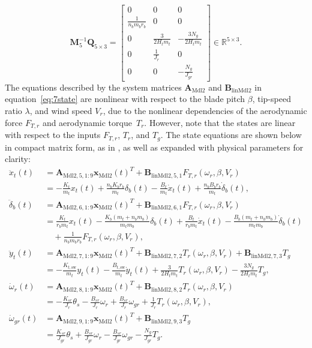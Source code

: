 \[
\mathbf{M}_5^{-1}\mathbf{Q}_{5 \times 3} = \begin{bmatrix}
     0 & 0 & 0\\
    \frac{1}{n_b m_b r_b} & 0 & 0 \\
     0 & \frac{3}{2 H_t m_t} & -\frac{3 N_g}{2 H_t m_t}\\
     0 & \frac{1}{J_r} & 0\\
     0 & 0 & -\frac{N_{g}}{J_{gr}}
\end{bmatrix} \in \mathbb{R}^{5 \times 3}.
\]
%
The equations described by the system matrices \(\bm{A}_{\text{Mdl2}}\) and \(\bm{B}_{\text{linMdl2}}\) in equation~\eqref{eq:7state} are nonlinear with respect to the blade pitch \(\beta\), tip-speed ratio \(\lambda\), and wind speed \(V_r\), due to the nonlinear dependencies of the aerodynamic force \(F_{T,r}\) and aerodynamic torque~\(T_r\). However, note that the states are linear with respect to the inputs $F_{T,r}$, $T_r$, and $T_g$. The state equations are shown below in compact matrix form, as in \cite{dittmer2021velocity}, as well as expanded with physical parameters for clarity:
\begin{align*}
    \ddot{x}_t(t) &= \bm{A}_{\text{Mdl2}, 5, 1:9} \bm{x}_{\text{Mdl2}}(t)^T + \bm{B}_{\text{linMdl2}, 5, 1} F_{T,r}(\omega_r, \beta, V_r) \\
    &= -\frac{K_t}{m_t} x_t(t) + \frac{n_b K_b r_b}{m_t} \delta_b(t)
    - \frac{B_t}{m_t} \dot{x}_t(t) + \frac{n_b B_b r_b}{m_t} \dot{\delta}_b(t), \\[1ex]
    \ddot{\delta}_b(t) &= \bm{A}_{\text{Mdl2}, 6, 1:9} \bm{x}_{\text{Mdl2}}(t)^T + \bm{B}_{\text{linMdl2}, 6, 1} F_{T,r}(\omega_r, \beta, V_r) \\
    &= \frac{K_t}{r_b m_t} x_t(t) - \frac{K_b(m_t + n_b m_b)}{m_t m_b} \delta_b(t)
    + \frac{B_t}{r_b m_t} \dot{x}_t(t) - \frac{B_b(m_t + n_b m_b)}{m_t m_b} \dot{\delta}_b(t) \\
    &\quad + \frac{1}{n_b m_b r_b} F_{T,r}(\omega_r, \beta, V_r), \\[1ex]
    \ddot{y}_t(t) &= \bm{A}_{\text{Mdl2}, 7, 1:9} \bm{x}_{\text{Mdl2}}(t)^T
    + \bm{B}_{\text{linMdl2}, 7, 2} T_r(\omega_r, \beta, V_r)
    + \bm{B}_{\text{linMdl2}, 7, 3} T_g \\
    &= -\frac{K_{t,\text{sw}}}{m_t} y_t(t) - \frac{B_{t,\text{sw}}}{m_t} \dot{y}_t(t)
    + \frac{3}{2 H_t m_t} T_r(\omega_r, \beta, V_r)
    - \frac{3 N_g}{2 H_t m_t} T_g, \\[1ex]
    \dot{\omega}_r(t) &= \bm{A}_{\text{Mdl2}, 8, 1:9} \bm{x}_{\text{Mdl2}}(t)^T + \bm{B}_{\text{linMdl2}, 8, 2} T_r(\omega_r, \beta, V_r) \\
    &= -\frac{K_{sr}}{J_r} \theta_s - \frac{B_{sr}}{J_r} \omega_r + \frac{B_{sr}}{J_r} \omega_{gr}
    + \frac{1}{J_r} T_r(\omega_r, \beta, V_r), \\[1ex]
    \dot{\omega}_{gr}(t) &= \bm{A}_{\text{Mdl2}, 9, 1:9} \bm{x}_{\text{Mdl2}}(t)^T + \bm{B}_{\text{linMdl2}, 9, 3} T_g \\
    &= \frac{K_{sr}}{J_{gr}} \theta_s + \frac{B_{sr}}{J_{gr}} \omega_r - \frac{B_{sr}}{J_{gr}} \omega_{gr}
    - \frac{N_g}{J_{gr}} T_g.
\end{align*}
